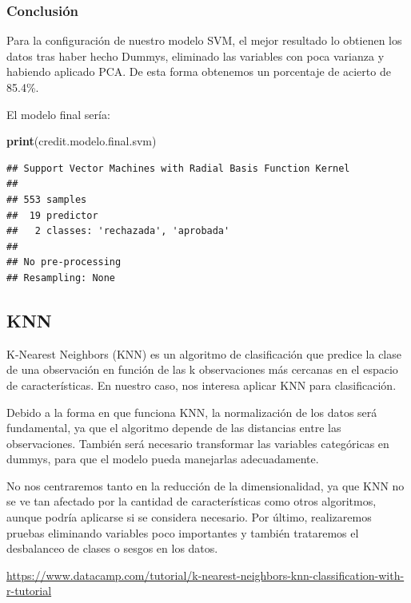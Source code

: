 \documentclass[
]{article}
\newenvironment{Shaded}{\begin{snugshade}}{\end{snugshade}}
\newcommand{\FunctionTok}[1]{\textcolor[rgb]{0.13,0.29,0.53}{\textbf{#1}}}
\newcommand{\NormalTok}[1]{#1}
\begin{document}
\hypertarget{conclusiuxf3n-1}{%
\subsubsection{Conclusión}\label{conclusiuxf3n-1}}

Para la configuración de nuestro modelo SVM, el mejor resultado lo
obtienen los datos tras haber hecho Dummys, eliminado las variables con
poca varianza y habiendo aplicado PCA. De esta forma obtenemos un
porcentaje de acierto de 85.4\%.

El modelo final sería:

\begin{Shaded}
\begin{Highlighting}[]
\FunctionTok{print}\NormalTok{(credit.modelo.final.svm)}
\end{Highlighting}
\end{Shaded}

\begin{verbatim}
## Support Vector Machines with Radial Basis Function Kernel 
## 
## 553 samples
##  19 predictor
##   2 classes: 'rechazada', 'aprobada' 
## 
## No pre-processing
## Resampling: None
\end{verbatim}

\hypertarget{knn}{%
\subsection{KNN}\label{knn}}

K-Nearest Neighbors (KNN) es un algoritmo de clasificación que predice
la clase de una observación en función de las k observaciones más
cercanas en el espacio de características. En nuestro caso, nos interesa
aplicar KNN para clasificación.

Debido a la forma en que funciona KNN, la normalización de los datos
será fundamental, ya que el algoritmo depende de las distancias entre
las observaciones. También será necesario transformar las variables
categóricas en dummys, para que el modelo pueda manejarlas
adecuadamente.

No nos centraremos tanto en la reducción de la dimensionalidad, ya que
KNN no se ve tan afectado por la cantidad de características como otros
algoritmos, aunque podría aplicarse si se considera necesario. Por
último, realizaremos pruebas eliminando variables poco importantes y
también trataremos el desbalanceo de clases o sesgos en los datos.

\url{https://www.datacamp.com/tutorial/k-nearest-neighbors-knn-classification-with-r-tutorial}
\end{document}
